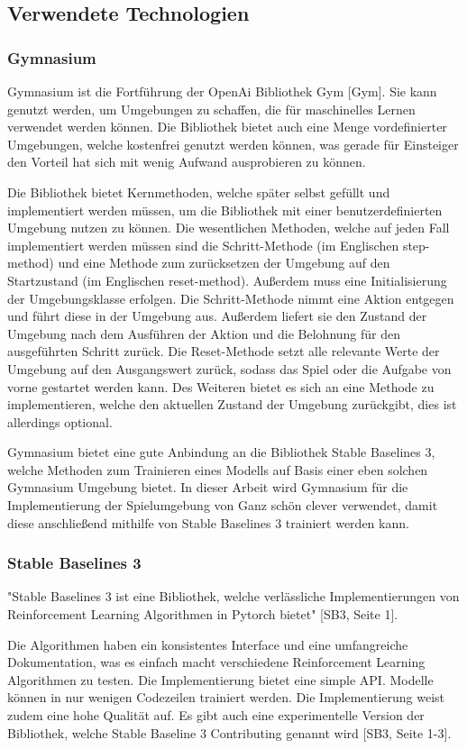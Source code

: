 \subsection{Verwendete Technologien}
\subsubsection{Gymnasium}
Gymnasium ist die Fortführung der OpenAi Bibliothek Gym [Gym]. Sie kann genutzt werden, um Umgebungen zu schaffen, die für maschinelles Lernen verwendet werden können. Die Bibliothek bietet auch eine Menge vordefinierter Umgebungen, welche kostenfrei genutzt werden können, was gerade für Einsteiger den Vorteil hat sich mit wenig Aufwand ausprobieren zu können.

Die Bibliothek bietet Kernmethoden, welche später selbst gefüllt und implementiert werden müssen, um die Bibliothek mit einer benutzerdefinierten Umgebung nutzen zu können. Die wesentlichen Methoden, welche auf jeden Fall implementiert werden müssen sind die Schritt-Methode (im Englischen step-method) und eine Methode zum zurücksetzen der Umgebung auf den Startzustand (im Englischen reset-method). Außerdem muss eine Initialisierung der Umgebungsklasse erfolgen. Die Schritt-Methode nimmt eine Aktion entgegen und führt diese in der Umgebung aus. Außerdem liefert sie den Zustand der Umgebung nach dem Ausführen der Aktion und die Belohnung für den ausgeführten Schritt zurück. Die Reset-Methode setzt alle relevante Werte der Umgebung auf den Ausgangswert zurück, sodass das Spiel oder die Aufgabe von vorne gestartet werden kann. Des Weiteren bietet es sich an eine Methode zu implementieren, welche den aktuellen Zustand der Umgebung zurückgibt, dies ist allerdings optional.

Gymnasium bietet eine gute Anbindung an die Bibliothek Stable Baselines 3, welche Methoden zum Trainieren eines Modells auf Basis einer eben solchen Gymnasium Umgebung bietet. In dieser Arbeit wird Gymnasium für die Implementierung der Spielumgebung von Ganz schön clever verwendet, damit diese anschließend mithilfe von Stable Baselines 3 trainiert werden kann.
\subsubsection{Stable Baselines 3}
"Stable Baselines 3 ist eine Bibliothek, welche verlässliche Implementierungen von Reinforcement Learning Algorithmen in Pytorch bietet" [SB3, Seite 1]. 

Die Algorithmen haben ein konsistentes Interface und eine umfangreiche Dokumentation, was es einfach macht verschiedene Reinforcement Learning Algorithmen zu testen. Die Implementierung bietet eine simple API. Modelle können in nur wenigen Codezeilen trainiert werden. Die Implementierung weist zudem eine hohe Qualität auf. Es gibt auch eine experimentelle Version der Bibliothek, welche Stable Baseline 3 Contributing genannt wird [SB3, Seite 1-3].

